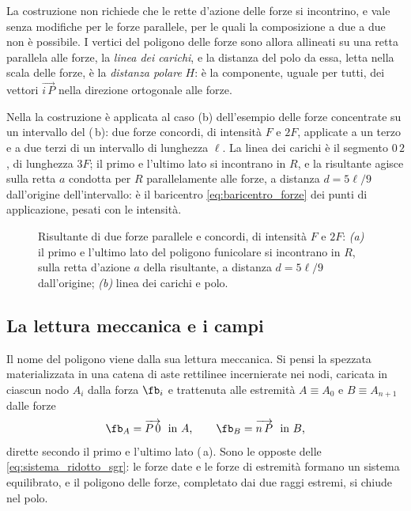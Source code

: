 La costruzione non richiede che le rette d'azione delle forze si incontrino, e vale senza
modifiche per le forze parallele, per le quali la composizione a due a due non è possibile. I
vertici del poligono delle forze sono allora allineati su una retta parallela alle forze, la
\emph{linea dei carichi}, e la distanza del polo da essa, letta nella scala delle forze, è la
\emph{distanza polare} $H$: è la componente, uguale per tutti, dei vettori $\overrightarrow{i\,P}$
nella direzione ortogonale alle forze.

Nella  la costruzione è applicata al caso (b) dell'esempio delle forze
concentrate su un intervallo del 
(\,b): due forze concordi, di intensità $F$ e
$2F$, applicate a un terzo e a due terzi di un intervallo di lunghezza $\ell$. La linea dei carichi
è il segmento $0\,2$, di lunghezza $3F$; il primo e l'ultimo lato si incontrano in $R$, e la
risultante agisce sulla retta $a$ condotta per $R$ parallelamente alle forze, a distanza
$d = 5\ell/9$ dall'origine dell'intervallo: è il baricentro \eqref{eq:baricentro_forze} dei punti
di applicazione, pesati con le intensità.

\begin{figure}[htbp]
	\centering
	\caption{Risultante di due forze parallele e concordi, di intensità $F$ e $2F$: \emph{(a)} il
		primo e l'ultimo lato del poligono funicolare si incontrano in $R$, sulla retta d'azione $a$
		della risultante, a distanza $d = 5\ell/9$ dall'origine; \emph{(b)} linea dei carichi e polo.}
	\label{fig:parallele_sgr}
\end{figure}

\subsection{La lettura meccanica e i campi}
\label{sec:lettura_meccanica_sgr}

Il nome del poligono viene dalla sua lettura meccanica. Si pensi la spezzata materializzata in una
catena di aste rettilinee incernierate nei nodi, caricata in ciascun nodo $A_i$ dalla forza
$\fb_i$ e trattenuta alle estremità $A \equiv A_0$ e $B \equiv A_{n+1}$ dalle forze
\begin{equation}
	\fb_A = \overrightarrow{P\,0} \ \text{ in } A , \qquad
	\fb_B = \overrightarrow{n\,P} \ \text{ in } B ,
	\label{eq:forze_estremita_sgr}
\end{equation}
dirette secondo il primo e l'ultimo lato (\,a). Sono le opposte delle
\eqref{eq:sistema_ridotto_sgr}: le forze date e le forze di estremità formano un sistema
equilibrato, e il poligono delle forze, completato dai due raggi estremi, si chiude nel polo.

